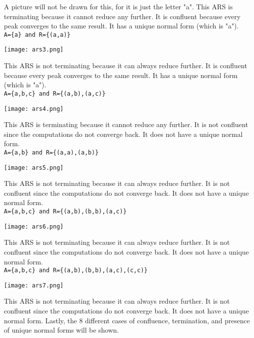 \documentclass{article}
\theoremstyle{theorem}
\theoremstyle{definition}
\theoremstyle{remark}
\begin{document}
A picture will not be drawn for this, for it is just the letter "a". This ARS is terminating because it cannot reduce any further. It is confluent because every peak converges to the same result. It has a unique normal form (which is "a").\\

\noindent \texttt{A=\{a\} and R=\{(a,a)\}}\\
\begin{center}
    \texttt{[image: ars3.png]}
\end{center}
This ARS is not terminating because it can always reduce further. It is confluent because every peak converges to the same result. It has a unique normal form (which is "a").\\

\noindent \texttt{A=\{a,b,c\} and R=\{(a,b),(a,c)\}}\\
\begin{center}
    \texttt{[image: ars4.png]}
\end{center}
This ARS is terminating because it cannot reduce any further. It is not confluent since the computations do not converge back. It does not have a unique normal form.\\

\noindent \texttt{A=\{a,b\} and R=\{(a,a),(a,b)\}}\\
\begin{center}
    \texttt{[image: ars5.png]}
\end{center}
This ARS is not terminating because it can always reduce further. It is not confluent since the computations do not converge back. It does not have a unique normal form.\\

\noindent \texttt{A=\{a,b,c\} and R=\{(a,b),(b,b),(a,c)\}}\\
\begin{center}
    \texttt{[image: ars6.png]}
\end{center}
This ARS is not terminating because it can always reduce further. It is not confluent since the computations do not converge back. It does not have a unique normal form.\\

\noindent \texttt{A=\{a,b,c\} and R=\{(a,b),(b,b),(a,c),(c,c)\}}\\
\begin{center}
    \texttt{[image: ars7.png]}
\end{center}
This ARS is not terminating because it can always reduce further. It is not confluent since the computations do not converge back. It does not have a unique normal form.
\newpage
Lastly, the 8 different cases of confluence, termination, and presence of unique normal forms will be shown.
\end{document}
